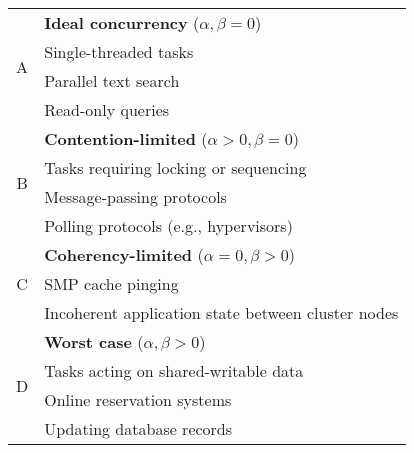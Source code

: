 \begin{tabular}{c|l} \hline

\multirow{4}{*}{A} & \textbf{Ideal concurrency} ($\alpha, \beta = 0$)      \\
                   & Single-threaded tasks                                 \\
                   & Parallel text search                                  \\
                   & Read-only queries                                     \\ \hline
\multirow{4}{*}{B} & \textbf{Contention-limited} ($\alpha > 0, \beta = 0$) \\
                   & Tasks requiring locking or sequencing                 \\
                   & Message-passing protocols                             \\
                   & Polling protocols (e.g., hypervisors)                 \\ \hline
\multirow{3}{*}{C} & \textbf{Coherency-limited} ($\alpha = 0, \beta > 0$)  \\
                   & SMP cache pinging                                     \\
                   & Incoherent application state between cluster nodes    \\ \hline
\multirow{4}{*}{D} & \textbf{Worst case} ($\alpha, \beta > 0$)             \\
                   & Tasks acting on shared-writable data                  \\
                   & Online reservation systems                            \\
                   & Updating database records                             \\ \hline
\end{tabular}
\\~\\
